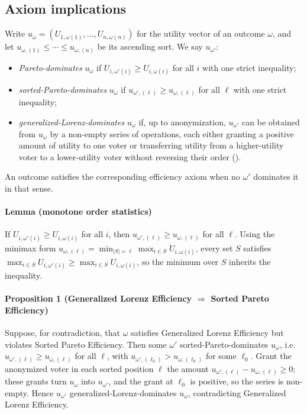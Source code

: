 \documentclass[11pt]{article}
\begin{document}
\subsection{Axiom implications} \label{app:axiom-implications}
Write $u_\omega=(U_{1,\omega(1)},\ldots,U_{n,\omega(n)})$ for the utility vector of an outcome $\omega$, and let $u_{\omega,(1)}\le\cdots\le u_{\omega,(n)}$ be its ascending sort. We say $u_{\omega'}$:
\begin{itemize}
\item \emph{Pareto-dominates} $u_\omega$ if $U_{i,\omega'(i)}\ge U_{i,\omega(i)}$ for all $i$ with one strict inequality;
\item \emph{sorted-Pareto-dominates} $u_\omega$ if $u_{\omega',(\ell)}\ge u_{\omega,(\ell)}$ for all $\ell$ with one strict inequality;
\item \emph{generalized-Lorenz-dominates} $u_\omega$ if, up to anonymization, $u_{\omega'}$ can be obtained from $u_\omega$ by a non-empty series of operations, each either granting a positive amount of utility to one voter or transferring utility from a higher-utility voter to a lower-utility voter without reversing their order ().
\end{itemize}
An outcome satisfies the corresponding efficiency axiom when no $\omega'$ dominates it in that sense.

\paragraph{Lemma (monotone order statistics)} If $U_{i,\omega'(i)}\ge U_{i,\omega(i)}$ for all $i$, then $u_{\omega',(\ell)}\ge u_{\omega,(\ell)}$ for all $\ell$. Using the minimax form $u_{\omega,(\ell)}=\min_{|S|=\ell}\max_{i\in S}U_{i,\omega(i)}$, every set $S$ satisfies $\max_{i\in S}U_{i,\omega'(i)}\ge\max_{i\in S}U_{i,\omega(i)}$, so the minimum over $S$ inherits the inequality.

\paragraph{Proposition 1 (Generalized Lorenz Efficiency $\Rightarrow$ Sorted Pareto Efficiency)} Suppose, for contradiction, that $\omega$ satisfies Generalized Lorenz Efficiency but violates Sorted Pareto Efficiency. Then some $\omega'$ sorted-Pareto-dominates $u_\omega$, i.e.\ $u_{\omega',(\ell)}\ge u_{\omega,(\ell)}$ for all $\ell$, with $u_{\omega',(\ell_0)}>u_{\omega,(\ell_0)}$ for some $\ell_0$. Grant the anonymized voter in each sorted position $\ell$ the amount $u_{\omega',(\ell)}-u_{\omega,(\ell)}\ge0$; these grants turn $u_\omega$ into $u_{\omega'}$, and the grant at $\ell_0$ is positive, so the series is non-empty. Hence $u_{\omega'}$ generalized-Lorenz-dominates $u_\omega$, contradicting Generalized Lorenz Efficiency.
\end{document}
